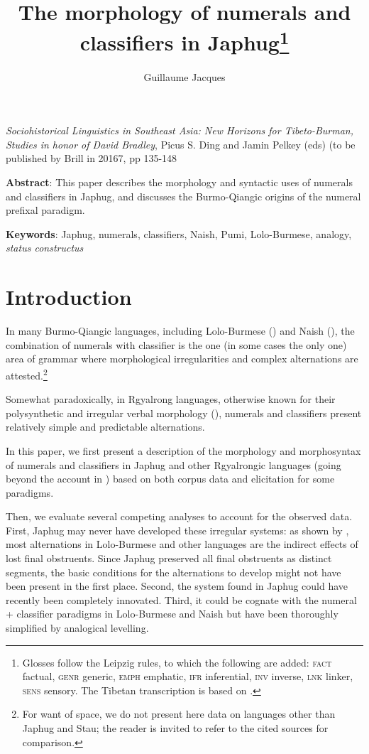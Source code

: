 \documentclass[oldfontcommands,oneside,a4paper,12pt]{article}
\begin{document}
\title{The morphology of numerals and classifiers  in Japhug\footnote{Glosses follow the Leipzig rules, to which the following are added:  \textsc{fact} factual, \textsc{genr} generic,   \textsc{emph} emphatic, \textsc{ifr} inferential, \textsc{inv} inverse, \textsc{lnk} linker, \textsc{sens} sensory. The Tibetan transcription is based on \citet{jacques12transcription}.} }
\author{Guillaume Jacques}
\maketitle

\sloppy
\textit{Sociohistorical Linguistics in Southeast Asia: New Horizons for Tibeto-Burman, Studies in honor of David Bradley}, Picus S. Ding and Jamin Pelkey (eds) (to be published by Brill in 20167, pp 135-148

\textbf{Abstract}: This paper describes the morphology and syntactic uses of numerals and classifiers in Japhug, and discusses the Burmo-Qiangic origins of the numeral prefixal paradigm.

\textbf{Keywords}: Japhug, numerals, classifiers, Naish, Pumi, Lolo-Burmese, analogy, \textit{status constructus}



\section{Introduction}
In many Burmo-Qiangic languages, including Lolo-Burmese (\citealt{bradley05numerals}) and Naish (\citealt{michaud11cl, michaud13numeral}), the combination of numerals with classifier is the one (in some cases the only one) area of grammar where morphological irregularities and complex alternations are attested.\footnote{For want of space, we do not present here data on languages other than Japhug and Stau; the reader is invited to refer to the cited sources for comparison.}

Somewhat paradoxically, in Rgyalrong languages, otherwise known for their polysynthetic and irregular verbal morphology (\citealt{jackson14morpho, jacques12incorp}), numerals and classifiers present relatively simple and predictable alternations. 

In this paper, we first present a  description of the morphology and morphosyntax of numerals and classifiers in Japhug and other Rgyalrongic  languages (going beyond the account in   \citealt{jacques08}) based on both corpus data and elicitation for some paradigms. 

Then, we evaluate several competing analyses to account for the observed data. First,   Japhug may never have developed these irregular systems: as shown by \citet{bradley05numerals}, most alternations in Lolo-Burmese and other languages  are the indirect effects of lost final obstruents. Since Japhug preserved all final obstruents as distinct segments, the basic conditions for the alternations to develop might not have been present in the first place. Second, the system found in Japhug could have recently been completely innovated. Third,  it could be cognate with the numeral + classifier paradigms in Lolo-Burmese and Naish but have been thoroughly simplified by analogical levelling.   
\end{document}
